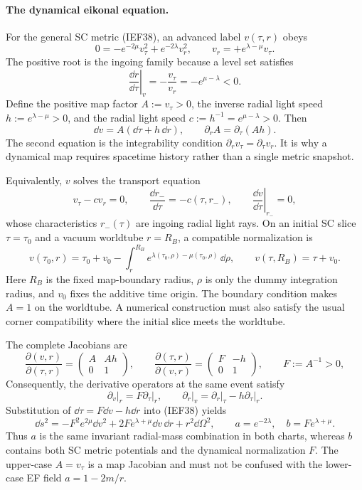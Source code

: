 \paragraph{The dynamical eikonal equation.}
For the general SC metric (IEF38), an advanced label \(v(\tau,r)\) obeys
\[
 0=-e^{-2\mu}v_\tau^2+e^{-2\lambda}v_r^2,\qquad
 v_r=+e^{\lambda-\mu}v_\tau.                              \tag{IEF38a}
\]
The positive root is the ingoing family because a level set satisfies
\[
 \left.\frac{\dd r}{\dd\tau}\right|_v
 =-\frac{v_\tau}{v_r}=-e^{\mu-\lambda}<0.                 \tag{IEF38b}
\]
Define the positive map factor \(A:=v_\tau>0\), the inverse radial light speed
\(h:=e^{\lambda-\mu}>0\), and the radial light speed
\(c:=h^{-1}=e^{\mu-\lambda}>0\).  Then
\[
 \dd v=A(\dd\tau+h\,\dd r),\qquad
 \partial_r A=\partial_\tau(Ah).                          \tag{IEF38c}
\]
The second equation is the integrability condition
\(\partial_r v_\tau=\partial_\tau v_r\).  It is why a dynamical map requires
spacetime history rather than a single metric snapshot.

Equivalently, \(v\) solves the transport equation
\[
 v_\tau-cv_r=0,\qquad
 \frac{\dd r_-}{\dd\tau}=-c(\tau,r_-),\qquad
 \left.\frac{\dd v}{\dd\tau}\right|_{r_-}=0,              \tag{IEF38c-1}
\]
whose characteristics \(r_-(\tau)\) are ingoing radial light rays.  On an
initial SC slice \(\tau=\tau_0\) and a vacuum worldtube \(r=R_B\), a compatible
normalization is
\[
 v(\tau_0,r)=\tau_0+v_0-\int_r^{R_B}
 e^{\lambda(\tau_0,\rho)-\mu(\tau_0,\rho)}\,\dd\rho,
 \qquad
 v(\tau,R_B)=\tau+v_0.                                   \tag{IEF38c-2}
\]
Here \(R_B\) is the fixed map-boundary radius, \(\rho\) is only the dummy
integration radius, and \(v_0\) fixes the additive time origin.  The boundary
condition makes \(A=1\) on the worldtube.  A numerical construction must also
satisfy the usual corner compatibility where the initial slice meets the
worldtube.

The complete Jacobians are
\[
 \frac{\partial(v,r)}{\partial(\tau,r)}
 =\begin{pmatrix}A&Ah\\0&1\end{pmatrix},\qquad
 \frac{\partial(\tau,r)}{\partial(v,r)}
 =\begin{pmatrix}F&-h\\0&1\end{pmatrix},\qquad F:=A^{-1}>0, \tag{IEF38c-5}
\]
Consequently, the derivative operators at the same event satisfy
\[
 \left.\partial_v\right|_r=F\left.\partial_\tau\right|_r,
 \qquad
 \left.\partial_r\right|_v
 =\left.\partial_r\right|_\tau-h\left.\partial_\tau\right|_r. \tag{IEF38c-6}
\]
Substitution of \(\dd\tau=F\dd v-h\dd r\) into (IEF38) yields
\[
 \dd s^2=-F^2e^{2\mu}\dd v^2
       +2F e^{\lambda+\mu}\dd v\,\dd r+r^2\dd\Omega^2,
 \qquad
 a=e^{-2\lambda},\quad b=F e^{\lambda+\mu}.               \tag{IEF38d}
\]
Thus \(a\) is the same invariant radial-mass combination in both charts,
whereas \(b\) contains both SC metric potentials and the dynamical
normalization \(F\).  The upper-case \(A=v_\tau\) is a map Jacobian and must
not be confused with the lower-case EF field \(a=1-2m/r\).

